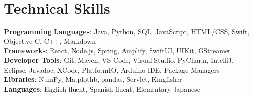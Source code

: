 \documentclass[letterpaper,11pt]{article}
\begin{document}
\section{Technical Skills}
 \begin{itemize}[leftmargin=0.15in, label={}]
    \small{\item{
     \textbf{Programming Languages}{: Java, Python, SQL, JavaScript, HTML/CSS, Swift, Objective-C, C++, Markdown} \\
     \textbf{Frameworks}{: React, Node.js, Spring, Amplify, SwiftUI, UIKit, GStreamer} \\
     \textbf{Developer Tools}{: Git, Maven, VS Code, Visual Studio, PyCharm, IntelliJ, Eclipse, Javadoc, XCode, PlatformIO, Arduino IDE, Package Managers} \\
     \textbf{Libraries}{: NumPy, Matplotlib, pandas, Servlet, Kingfisher}\\
     \textbf{Languages}{: English fluent, Spanish fluent, Elementary Japanese} \\
    }}
 \end{itemize}


\end{document}

